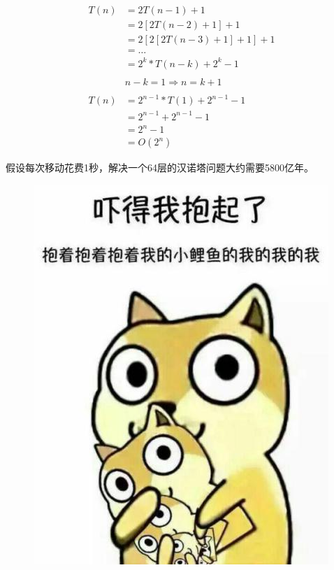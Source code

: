 \begin{align*}
	T(n) & = 2T(n-1) + 1                   \\
	     & = 2[2T(n-2) + 1] + 1            \\
	     & = 2[2[2T(n-3) + 1] + 1] + 1     \\
	     & = \dots                         \\
	     & = 2^k * T(n-k) + 2^k - 1        \\
	\\
	     & n - k = 1 \Rightarrow n = k + 1 \\
	\\
	T(n) & = 2^{n-1} * T(1) + 2^{n-1} - 1  \\
	     & = 2^{n-1} + 2^{n-1} - 1         \\
	     & = 2^n - 1                       \\
	     & = O(2^n)
\end{align*}

假设每次移动花费1秒，解决一个64层的汉诺塔问题大约需要5800亿年。\\

\begin{figure}[H]
	\centering
	\includegraphics[]{img/Chapter1/1-2/1.png}
\end{figure}

